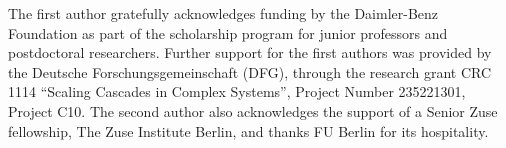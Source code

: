 \documentclass[12pt]{article}
\begin{document}
The first author gratefully acknowledges funding by the Daimler-Benz Foundation as part of the scholarship program for junior professors and postdoctoral researchers. Further support for the first authors was provided by the Deutsche Forschungsgemeinschaft (DFG), through the research grant CRC 1114 ``Scaling Cascades in Complex Systems'', Project Number 235221301, Project C10. The second author also acknowledges the support of a Senior Zuse fellowship, The Zuse Institute Berlin, and thanks FU Berlin for its hospitality.



%


%


\end{document}
